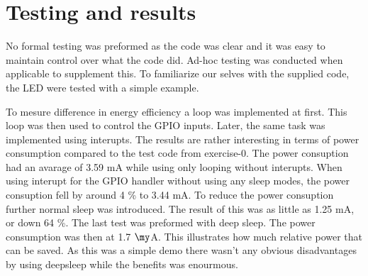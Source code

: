 \section{Testing and results}
No formal testing was preformed as the code was clear and it was easy to maintain control over what the code did.
Ad-hoc testing was conducted when applicable to supplement this.
To familiarize our selves with the supplied code, the LED were tested with a simple example.

To mesure difference in energy efficiency a loop was implemented at first. 
This loop was then used to control the GPIO inputs. Later, the same task was implemented using interupts.
The results are rather interesting in terms of power consumption compared to the test code from exercise-0.
The power consuption had an avarage of 3.59 mA while using only looping without interupts. 
When using interupt for the GPIO handler without using any sleep modes, the power consuption fell by around 4 \% to 3.44 mA.
To reduce the power consuption further normal sleep was introduced. The result of this was as little as 1.25 mA, or down 64 \%.
The last test was preformed with deep sleep. The power consumption was then at 1.7 $\my$A. 
This illustrates how much relative power that can be saved. 
As this was a simple demo there wasn't any obvious disadvantages by using deepsleep while the benefits was enourmous.
